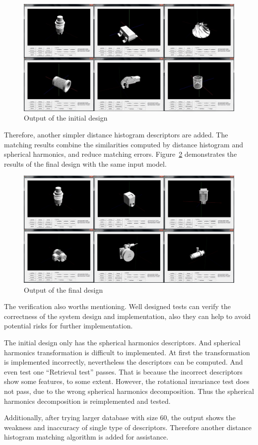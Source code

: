 \begin{figure}[h]
\centering
\includegraphics[width=0.7\linewidth]{output_initialdesign}
\caption{Output of the initial design} \label{output_initialdesign}
\end{figure}

Therefore, another simpler distance histogram  descriptors are added. The matching results combine the similarities computed by distance histogram and spherical harmonics, and reduce matching errors. Figure~\ref{output_finaldesign} demonstrates the results of the final design with the same input model. 
\begin{figure}[h]
\centering
\includegraphics[width=0.7\linewidth]{output_finaldesign}
\caption{Output of the final design} \label{output_finaldesign}
\end{figure}

The verification also worths mentioning. Well designed tests can verify the correctness of the system design and implementation, also they can help to avoid potential risks for further implementation. 

The initial design only has the spherical harmonics descriptors. And spherical harmonics transformation is difficult to implemented. At first the transformation is implemented incorrectly, nevertheless the descriptors can be computed. And even test one ``Retrieval test'' passes. That is because the incorrect descriptors show some features, to some extent. However, the rotational invariance test does not pass, due to the wrong spherical harmonics decomposition. Thus the spherical harmonics decomposition is reimplemented and tested. 

Additionally, after trying larger database with size 60, the output shows the weakness and inaccuracy of single type of descriptors. Therefore another distance histogram matching algorithm is added for assistance.
